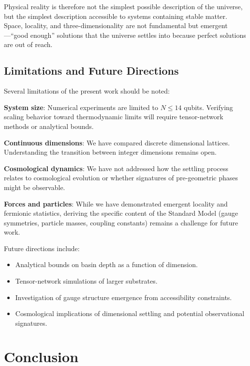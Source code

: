 \documentclass[11pt]{article}
\begin{document}
Physical reality is therefore not the simplest possible description of the universe, but the simplest description accessible to systems containing stable matter. Space, locality, and three-dimensionality are not fundamental but emergent---``good enough'' solutions that the universe settles into because perfect solutions are out of reach.

\subsection{Limitations and Future Directions}

Several limitations of the present work should be noted:

\textbf{System size}: Numerical experiments are limited to $N \leq 14$ qubits. Verifying scaling behavior toward thermodynamic limits will require tensor-network methods or analytical bounds.

\textbf{Continuous dimensions}: We have compared discrete dimensional lattices. Understanding the transition between integer dimensions remains open.

\textbf{Cosmological dynamics}: We have not addressed how the settling process relates to cosmological evolution or whether signatures of pre-geometric phases might be observable.

\textbf{Forces and particles}: While we have demonstrated emergent locality and fermionic statistics, deriving the specific content of the Standard Model (gauge symmetries, particle masses, coupling constants) remains a challenge for future work.

Future directions include:
\begin{itemize}
\item Analytical bounds on basin depth as a function of dimension.
\item Tensor-network simulations of larger substrates.
\item Investigation of gauge structure emergence from accessibility constraints.
\item Cosmological implications of dimensional settling and potential observational signatures.
\end{itemize}

\section{Conclusion}
\end{document}

